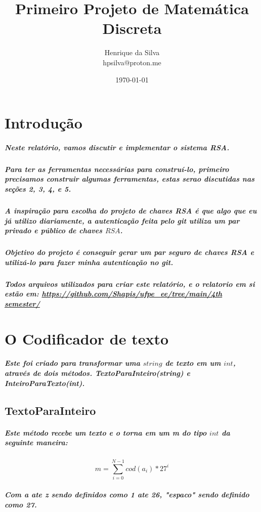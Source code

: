 \documentclass[12pt,twoside, a4paper, twocolumn]{article}
\title{Primeiro Projeto de Matemática Discreta}
\author{Henrique da Silva \\ hpsilva@proton.me}
\date{\today}
\begin{document}
\maketitle
{}
\newpage
\tableofcontents
\newpage



\section{Introdução}


\subparagraph*{Neste relatório, vamos discutir e implementar o sistema RSA.}

\subparagraph*{Para ter as ferramentas necessárias para construí-lo, primeiro precisamos construir algumas ferramentas, estas serao discutidas nas seções 2, 3, 4, e 5.}

\subparagraph*{A inspiração para escolha do projeto de chaves RSA é que algo que eu já utilizo diariamente, a autenticação feita pelo \emph{git} utiliza um par privado e público de chaves $RSA$. }

\subparagraph*{Objetivo do projeto é conseguir gerar um par seguro de chaves \emph{RSA} e utilizá-lo para fazer minha autenticação no \emph{git}.}

\subparagraph*{Todos arquivos utilizados para criar este relatório, e o relatorio em si estão em:  \url{https://github.com/Shapis/ufpe_ee/tree/main/4th semester/}}

\section{O Codificador de texto}

\subparagraph*{Este foi criado para transformar uma $string$ de texto em um $int$, através de dois métodos. TextoParaInteiro(string) e InteiroParaTexto(int). }

\subsection{TextoParaInteiro}

\subparagraph*{Este método recebe um texto e o torna em um m do tipo $int$ da seguinte maneira:}

\begin{equation}
    m = \sum_{i=0}^{N - 1} cod(a_i)*27^i
\end{equation}

\subparagraph*{Com \emph{a} ate \emph{z} sendo definidos como 1 ate 26, "espaco" sendo definido como 27.}
\end{document}
